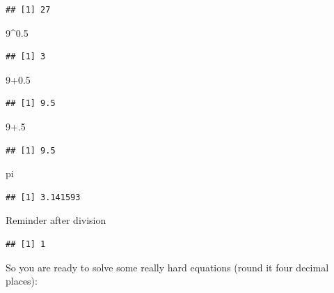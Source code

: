 \documentclass[
]{book}
\makeatletter
\newenvironment{Shaded}{\begin{snugshade}}{\end{snugshade}}
\newcommand{\DecValTok}[1]{\textcolor[rgb]{0.00,0.00,0.81}{#1}}
\newcommand{\FloatTok}[1]{\textcolor[rgb]{0.00,0.00,0.81}{#1}}
\newcommand{\NormalTok}[1]{#1}
\newcommand{\OperatorTok}[1]{\textcolor[rgb]{0.81,0.36,0.00}{\textbf{#1}}}
\newcommand{\StringTok}[1]{\textcolor[rgb]{0.31,0.60,0.02}{#1}}
\newenvironment{kframe}{%
\medskip{}
\setlength{\fboxsep}{.8em}
 \def\at@end@of@kframe{}%
 \ifinner\ifhmode%
  \def\at@end@of@kframe{\end{minipage}}%
  \begin{minipage}{\columnwidth}%
 \fi\fi%
 \def\FrameCommand##1{\hskip\@totalleftmargin \hskip-\fboxsep
 \colorbox{shadecolor}{##1}\hskip-\fboxsep
     \hskip-\linewidth \hskip-\@totalleftmargin \hskip\columnwidth}%
 \MakeFramed {\advance\hsize-\width
   \@totalleftmargin\z@ \linewidth\hsize
   \@setminipage}}%
 {\par\unskip\endMakeFramed%
 \at@end@of@kframe}
\newenvironment{rmdblock}[1]
  {
  \begin{itemize}
  \renewcommand{\labelitemi}{
    \raisebox{-.7\height}[0pt][0pt]{
      {\setkeys{Gin}{width=3em,keepaspectratio}\texttt{[image: images/\#1]}}
    }
  }
  \setlength{\fboxsep}{1em}
  \begin{kframe}
  \item
  }
  {
  \end{kframe}
  \end{itemize}
  }
\newenvironment{rmdtask}
  {\begin{rmdblock}{task}}
  {\end{rmdblock}}
\makeatother
\begin{document}
\begin{verbatim}
## [1] 27
\end{verbatim}

\begin{Shaded}
\begin{Highlighting}[]
\DecValTok{9}\OperatorTok{^}\FloatTok{0.5}
\end{Highlighting}
\end{Shaded}

\begin{verbatim}
## [1] 3
\end{verbatim}

\begin{Shaded}
\begin{Highlighting}[]
\DecValTok{9}\FloatTok{+0.5}
\end{Highlighting}
\end{Shaded}

\begin{verbatim}
## [1] 9.5
\end{verbatim}

\begin{Shaded}
\begin{Highlighting}[]
\DecValTok{9}\FloatTok{+.5}
\end{Highlighting}
\end{Shaded}

\begin{verbatim}
## [1] 9.5
\end{verbatim}

\begin{Shaded}
\begin{Highlighting}[]
\NormalTok{pi}
\end{Highlighting}
\end{Shaded}

\begin{verbatim}
## [1] 3.141593
\end{verbatim}

Reminder after division

\begin{Shaded}
\end{Shaded}

\begin{verbatim}
## [1] 1
\end{verbatim}

\begin{rmdtask}
So you are ready to solve some really hard equations (round it four
decimal places):
\end{rmdtask}
\end{document}
